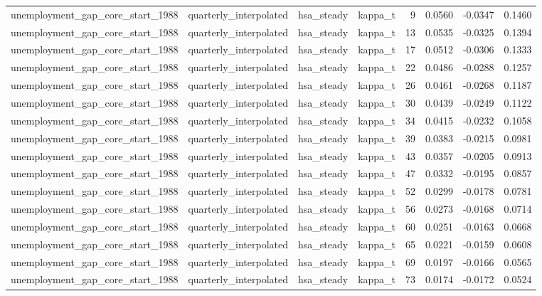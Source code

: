 \begin{tabular}{llllrrrr}
unemployment\_gap\_core\_start\_1988 & quarterly\_interpolated & hsa\_steady & kappa\_t & 9 & 0.0560 & -0.0347 & 0.1460 \\
unemployment\_gap\_core\_start\_1988 & quarterly\_interpolated & hsa\_steady & kappa\_t & 13 & 0.0535 & -0.0325 & 0.1394 \\
unemployment\_gap\_core\_start\_1988 & quarterly\_interpolated & hsa\_steady & kappa\_t & 17 & 0.0512 & -0.0306 & 0.1333 \\
unemployment\_gap\_core\_start\_1988 & quarterly\_interpolated & hsa\_steady & kappa\_t & 22 & 0.0486 & -0.0288 & 0.1257 \\
unemployment\_gap\_core\_start\_1988 & quarterly\_interpolated & hsa\_steady & kappa\_t & 26 & 0.0461 & -0.0268 & 0.1187 \\
unemployment\_gap\_core\_start\_1988 & quarterly\_interpolated & hsa\_steady & kappa\_t & 30 & 0.0439 & -0.0249 & 0.1122 \\
unemployment\_gap\_core\_start\_1988 & quarterly\_interpolated & hsa\_steady & kappa\_t & 34 & 0.0415 & -0.0232 & 0.1058 \\
unemployment\_gap\_core\_start\_1988 & quarterly\_interpolated & hsa\_steady & kappa\_t & 39 & 0.0383 & -0.0215 & 0.0981 \\
unemployment\_gap\_core\_start\_1988 & quarterly\_interpolated & hsa\_steady & kappa\_t & 43 & 0.0357 & -0.0205 & 0.0913 \\
unemployment\_gap\_core\_start\_1988 & quarterly\_interpolated & hsa\_steady & kappa\_t & 47 & 0.0332 & -0.0195 & 0.0857 \\
unemployment\_gap\_core\_start\_1988 & quarterly\_interpolated & hsa\_steady & kappa\_t & 52 & 0.0299 & -0.0178 & 0.0781 \\
unemployment\_gap\_core\_start\_1988 & quarterly\_interpolated & hsa\_steady & kappa\_t & 56 & 0.0273 & -0.0168 & 0.0714 \\
unemployment\_gap\_core\_start\_1988 & quarterly\_interpolated & hsa\_steady & kappa\_t & 60 & 0.0251 & -0.0163 & 0.0668 \\
unemployment\_gap\_core\_start\_1988 & quarterly\_interpolated & hsa\_steady & kappa\_t & 65 & 0.0221 & -0.0159 & 0.0608 \\
unemployment\_gap\_core\_start\_1988 & quarterly\_interpolated & hsa\_steady & kappa\_t & 69 & 0.0197 & -0.0166 & 0.0565 \\
unemployment\_gap\_core\_start\_1988 & quarterly\_interpolated & hsa\_steady & kappa\_t & 73 & 0.0174 & -0.0172 & 0.0524 \\

\end{tabular}
